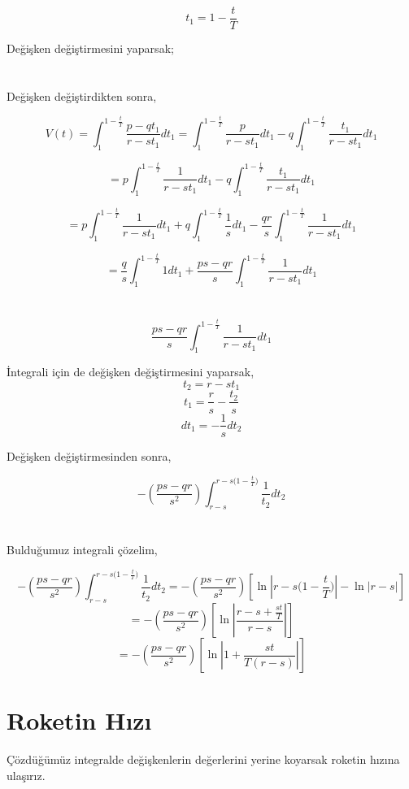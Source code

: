 \documentclass[a4paper,10pt]{article}
\begin{document}
 \[
  t_1 = 1 - \frac{t}{T}
 \]
 
    Değişken değiştirmesini yaparsak;
    
\section{}

Değişken değiştirdikten sonra,

\[
 V(t) = \int_1^{1-\frac{t}{T}}\frac{p-qt_1}{r-st_1} dt_1 = \int_1^{1-\frac{t}{T}}\frac{p}{r-st_1} dt_1 - q \int_1^{1-\frac{t}{T}}\frac{t_1}{r-st_1} dt_1
\]

\[ 
 = p\int_1^{1-\frac{t}{T}}\frac{1}{r-st_1} dt_1 - q \int_1^{1-\frac{t}{T}}\frac{t_1}{r-st_1}dt_1
\]

\[ 
 = p\int_1^{1-\frac{t}{T}}\frac{1}{r-st_1} dt_1 +q \int_1^{1-\frac{t}{T}}\frac{1}{s} dt_1 -\frac{qr}{s}\int_1^{1-\frac{t}{T}}\frac{1}{r-st_1} dt_1
\]

\[
 = \frac{q}{s}\int_1^{1-\frac{t}{T}}{1}dt_1 + \frac{ps-qr}{s}\int_1^{1-\frac{t}{T}}\frac{1}{r-st_1} dt_1
\]

\section{}

\[
\frac{ps-qr}{s}\int_1^{1-\frac{t}{T}}\frac{1}{r-st_1} dt_1
\]

İntegrali için de değişken değiştirmesini yaparsak,
\[
 t_2 = r-st_1
 \]
 \[
 t_1 = \frac{r}{s} - \frac{t_2}{s}
\]
\[
 dt_1 = - \frac{1}{s}dt_2
\]

Değişken değiştirmesinden sonra,

\[
 -(\frac{ps-qr}{s^2})\int_{r-s}^{r-s{(1-\frac{t}{T}})}\frac{1}{t_2}dt_2
\]

\section{}
Bulduğumuz integrali çözelim,

\[
 -(\frac{ps-qr}{s^2})\int_{r-s}^{r-s{(1-\frac{t}{T}})} \frac{1}{t_2}dt_2  = -(\frac{ps-qr}{s^2})[\ln{|{r-s{(1-\frac{t}{T}})}|} - \ln{|r-s|}]
 \]
\[
 = -(\frac{ps-qr}{s^2})[\ln|{\frac{r-s+\frac{st}{T}}{r-s}}|]
\]
\[
 = -(\frac{ps-qr}{s^2})[\ln|1 + \frac{st}{T(r-s)}|]
\]

\section{Roketin Hızı}
  Çözdüğümüz integralde değişkenlerin değerlerini yerine koyarsak roketin hızına ulaşırız. 
  
\end{document}
